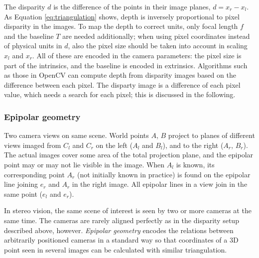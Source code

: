 The disparity $d$ is the difference of the points in their image planes, $d = x_r - x_l$.
As Equation \ref{eq:triangulation} shows, depth is inversely proportional to pixel disparity in the images.
To map the depth to correct units, only focal length $f$ and the baseline $T$ are needed additionally; when using pixel coordinates instead of physical units in $d$, also the pixel size should be taken into account in scaling $x_l$ and $x_r$.
All of these are encoded in the camera parameters: the pixel size is part of the intrinsics, and the baseline is encoded in extrinsics.
Algorithms such as those in OpenCV \cite{opencv} can compute depth from disparity images based on the difference between each pixel.
The disparty image is a difference of each pixel value, which needs a search for each pixel;
this is discussed in the following.


\subsubsection{Epipolar geometry} %

{Two camera views on same scene.
World points $A$, $B$ project to planes of different views imaged from $C_l$ and $C_r$ on the left ($A_l$ and $B_l$), and to the right ($A_r$, $B_r$).
The actual images cover some area of the total projection plane, and the epipolar point may or may not lie visible in the image.
When $A_l$ is known, its corresponding point $A_r$ (not initially known in practice) is found on the epipolar line joining $e_r$ and $A_r$ in the right image.
All epipolar lines in a view join in the same point ($e_l$ and $e_r$).}


In stereo vision, the same scene of interest is seen by two or more cameras at the same time.
The cameras are rarely aligned perfectly as in the disparity setup described above, however.
\emph{Epipolar geometry} encodes the relations between arbitrarily positioned cameras in a standard way so that coordinates of a 3D point seen in several images can be calculated with similar triangulation.
\cite{hartley03multiview}

